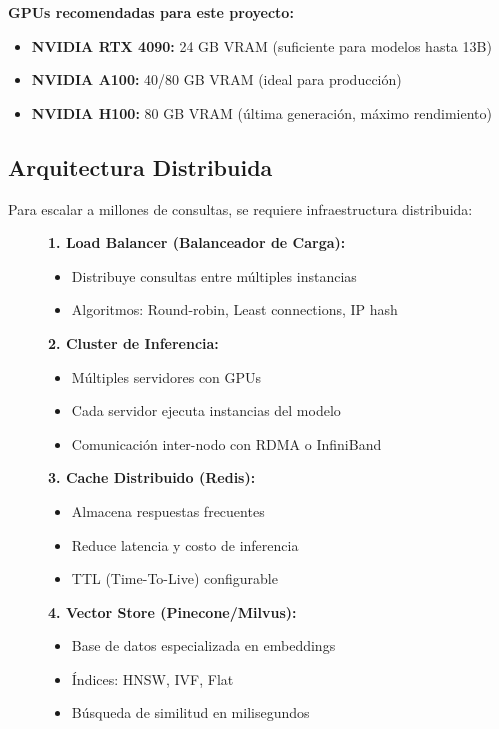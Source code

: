 \documentclass[12pt,a4paper]{article}
\begin{document}
\textbf{GPUs recomendadas para este proyecto:}
\begin{itemize}
    \item \textbf{NVIDIA RTX 4090:} 24 GB VRAM (suficiente para modelos hasta 13B)
    \item \textbf{NVIDIA A100:} 40/80 GB VRAM (ideal para producción)
    \item \textbf{NVIDIA H100:} 80 GB VRAM (última generación, máximo rendimiento)
\end{itemize}

\subsection{Arquitectura Distribuida}

Para escalar a millones de consultas, se requiere infraestructura distribuida:

\begin{figure}[H]
\centering
\begin{tcolorbox}[colback=orange!5!white,colframe=orange!75!black,title=Componentes de Infraestructura]
\textbf{1. Load Balancer (Balanceador de Carga):}
\begin{itemize}
    \item Distribuye consultas entre múltiples instancias
    \item Algoritmos: Round-robin, Least connections, IP hash
\end{itemize}

\textbf{2. Cluster de Inferencia:}
\begin{itemize}
    \item Múltiples servidores con GPUs
    \item Cada servidor ejecuta instancias del modelo
    \item Comunicación inter-nodo con RDMA o InfiniBand
\end{itemize}

\textbf{3. Cache Distribuido (Redis):}
\begin{itemize}
    \item Almacena respuestas frecuentes
    \item Reduce latencia y costo de inferencia
    \item TTL (Time-To-Live) configurable
\end{itemize}

\textbf{4. Vector Store (Pinecone/Milvus):}
\begin{itemize}
    \item Base de datos especializada en embeddings
    \item Índices: HNSW, IVF, Flat
    \item Búsqueda de similitud en milisegundos
\end{itemize}
\end{tcolorbox}
\end{figure}
\end{document}
